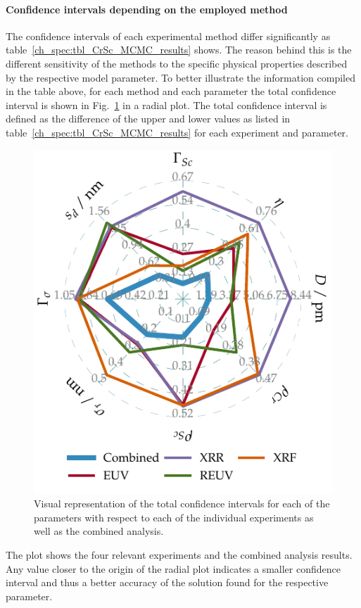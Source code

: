 \paragraph{Confidence intervals depending on the employed method}
The confidence intervals of each experimental method differ significantly as table~\ref{ch_spec:tbl_CrSc_MCMC_results} shows. The reason behind this is the different sensitivity of the methods to the specific physical properties described by the respective model parameter. To better illustrate the information compiled in the table above, for each method and each parameter the total confidence interval is shown in Fig.~\ref{fig:confidence_intervals} in a radial plot. The total confidence interval is defined as the difference of the upper and lower values as listed in table~\ref{ch_spec:tbl_CrSc_MCMC_results} for each experiment and parameter.
\begin{figure}[htbp]
  \centering
\includegraphics{img/CrSc_confidence_intervals_radar}
  \caption{Visual representation of the total confidence intervals for each of 
the parameters with respect to each of the individual experiments as well as 
the combined analysis.}
  \label{fig:confidence_intervals}
\end{figure}
The plot shows the four relevant experiments and the combined analysis results. Any value closer to the origin of the radial plot indicates a smaller confidence interval and thus a better accuracy of the solution found for the respective parameter.

